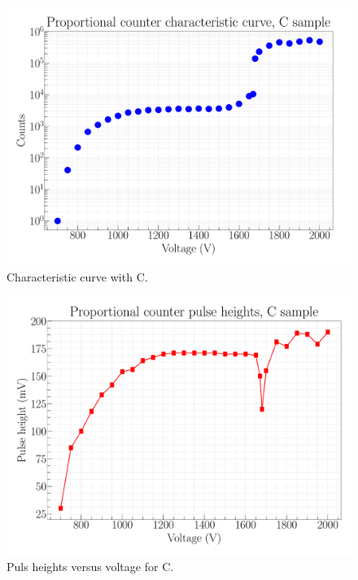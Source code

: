 \begin{figure}[H]
\centering
\includegraphics[width=\textwidth]{../Figures/Proportional_characteristic_curve_C.pdf}
\caption{Characteristic curve with C.}
\label{fig:CChar}
\end{figure}

\begin{figure}[H]
\centering
\includegraphics[width=\textwidth]{../Figures/Proportional_pulse_heights_C.pdf}
\caption{Puls heights versus voltage for C.}
\label{fig:CPH}
\end{figure}

